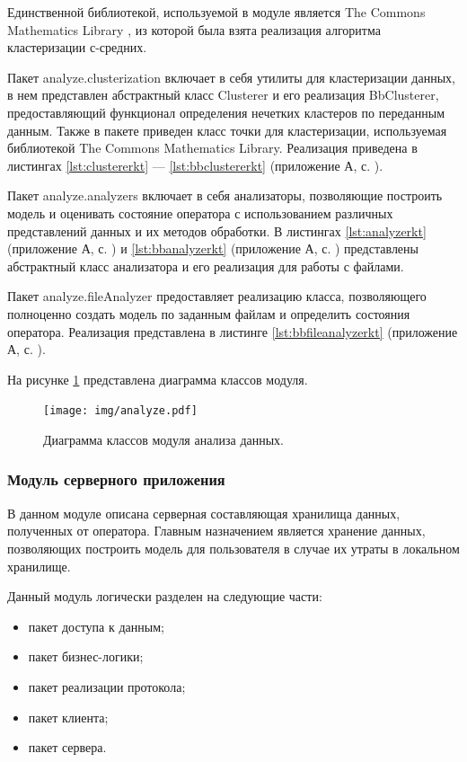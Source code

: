 Единственной библиотекой, используемой в модуле является \foreignlanguage{english}{The Commons Mathematics Library} \cite{apachemath3}, из которой была взята реализация алгоритма кластеризации с-средних.

Пакет analyze.clusterization включает в себя утилиты для кластеризации данных, в нем представлен абстрактный класс Clusterer и его реализация BbClusterer, предоставляющий функционал определения нечетких кластеров по переданным данным. Также в пакете приведен класс точки для кластеризации, используемая библиотекой The Commons Mathematics Library. Реализация приведена в листингах \ref{lst:clustererkt} --- \ref{lst:bbclustererkt} (приложение А, с. \pageref{chp:application-a}).

Пакет analyze.analyzers включает в себя анализаторы, позволяющие построить модель и оценивать состояние оператора с использованием различных представлений данных и их методов обработки. В листингах \ref{lst:analyzerkt} (приложение А, с. \pageref{chp:application-a}) и \ref{lst:bbanalyzerkt} (приложение А, с. \pageref{chp:application-a}) представлены абстрактный класс анализатора и его реализация для работы с файлами.

Пакет analyze.fileAnalyzer предоставляет реализацию класса, позволяющего полноценно создать модель по заданным файлам и определить состояния оператора. Реализация представлена в листинге \ref{lst:bbfileanalyzerkt} (приложение А, с. \pageref{chp:application-a}).

На рисунке \ref{fig:analyzerUml} представлена диаграмма классов модуля.

\begin{figure}[H]
	\centering
	\texttt{[image: img/analyze.pdf]}
	\caption{Диаграмма классов модуля анализа данных.}
	\label{fig:analyzerUml}
\end{figure}

\subsubsection{Модуль серверного приложения}
В данном модуле описана серверная составляющая хранилища данных, полученных от оператора. Главным назначением является хранение данных, позволяющих построить модель для пользователя в случае их утраты в локальном хранилище.

Данный модуль логически разделен на следующие части:

\begin{itemize}[leftmargin=1.6\parindent]
	\item пакет доступа к данным;
	\item пакет бизнес-логики;
	\item пакет реализации протокола;
	\item пакет клиента;
	\item пакет сервера.
\end{itemize}

